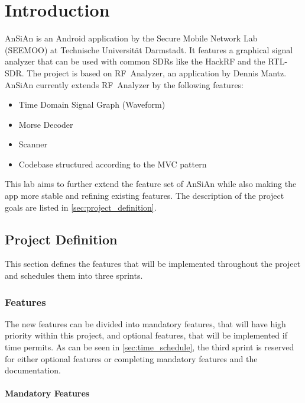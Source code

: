 \chapter{Introduction}\label{ch:introduction}
\glsresetall %
\setcounter{table}{0} %

\ac{AnSiAn} is an Android application by the Secure Mobile Network Lab (SEEMOO) at 
Technische Universität Darmstadt. It features a graphical signal analyzer that can be used with common \acp{SDR} like the
HackRF and the RTL-SDR. The project is based on RF~Analyzer, an application by
Dennis Mantz. \ac{AnSiAn} currently extends RF~Analyzer by the following features: 
\begin{itemize}
	\item Time Domain Signal Graph (Waveform)
	\item Morse Decoder
	\item Scanner
	\item Codebase structured according to the \ac{MVC} pattern
\end{itemize}

This lab aims to further extend the feature set of \ac{AnSiAn} while also
making the app more stable and refining existing features. The description of
the project goals are listed in \autoref{sec:project_definition}.


\section{Project Definition\label{sec:project_definition}}

This section defines the features that will be implemented throughout the
project and schedules them into three sprints.

\subsection{Features}

The new features can be divided into mandatory features, that will have high
priority within this project, and optional features, that will be implemented
if time permits. As can be seen in \autoref{sec:time_schedule}, the third
sprint is reserved for either optional features or completing mandatory
features and the documentation.

\subsubsection{Mandatory Features}

